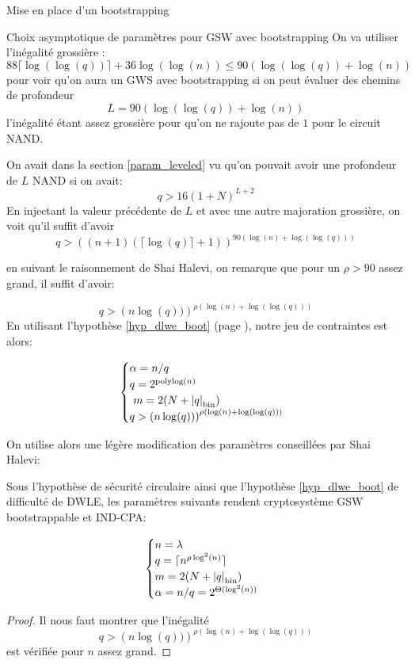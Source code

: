 \begin{section}{Mise en place d'un bootstrapping}
\begin{subsection}{Choix asymptotique de paramètres pour GSW avec bootstrapping}
On va utiliser l'inégalité grossière :
\[
88 \lceil\log(\log(q))\rceil + 36 \log(\log(n)) \leq 90\left(\log(\log(q)) + \log(n)\right) \]
pour voir qu'on aura un GWS avec bootstrapping si on peut évaluer des chemins
de profondeur
\[ L = 90 \left(\log(\log(q)) + \log(n)\right) \]
l'inégalité étant assez grossière pour qu'on ne rajoute pas de $1$ pour le circuit NAND.

On avait dans la section \ref{param_leveled} vu qu'on pouvait avoir une
profondeur de $L$ NAND si on avait: 
\begin{equation}
q > 16 {(1+N)}^{L+2}
\end{equation}
En injectant la valeur précédente de $L$ et avec une autre majoration
grossière, on voit qu'il suffit d'avoir
\begin{equation}
q > {\left((n+1)(\lceil \log(q) \rceil + 1 )\right)}^{90 \left(\log(n) +
\log(\log(q))\right)}
\end{equation}

en suivant le raisonnement de Shai Halevi, on remarque 
que pour un $\rho > 90$ assez grand, il suffit d'avoir:

\begin{equation}
q > {\left(n\log(q))\right)}^{\rho \left(\log(n) + \log(\log(q))\right)}
\end{equation}
En utilisant l'hypothèse  \ref{hyp_dlwe_boot} (page \pageref{hyp_dlwe_boot}), notre jeu de contraintes est alors:

\[ \begin{cases}
\alpha  = n /q \\
	q = 2^\text{polylog$(n)$}\\ 
	m = 2(N + \bnorm{q}) \\  
	q > {\left(n\log(q))\right)}^{\rho \left(\log(n) + \log(\log(q))\right)}
	\end{cases} \]

On utilise alors une légère modification des paramètres conseillées par Shai Halevi:
\begin{thm}
Sous l'hypothèse de sécurité circulaire ainsi que l'hypothèse \ref{hyp_dlwe_boot} de difficulté de DWLE, les paramètres
suivants rendent cryptosystème GSW bootstrappable et IND-CPA:

\[ \begin{cases}
 	n = \lambda \\
	q = \lceil n^{\rho \log^2(n)}\rceil \\
	m = 2(N + \bnorm{q}) \\  
	\alpha = n/q = 2^{\Theta(\log^2(n))}
	\end{cases} \]
\end{thm}
\begin{proof}
Il nous faut montrer que l'inégalité 
	\[ q > {\left(n\log(q))\right)}^{\rho \left(\log(n) +
	\log(\log(q))\right)} \]
est vérifiée pour $n$ assez grand.


\end{proof}
\end{subsection}
\end{section}
